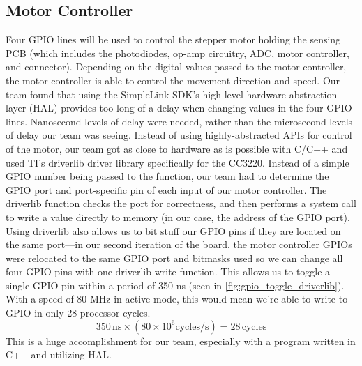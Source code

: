 \documentclass[journal]{IEEEtran}
\begin{document}
\subsection{Motor Controller}
Four GPIO lines will be used to control the stepper motor holding the sensing PCB (which includes the photodiodes, op-amp circuitry, ADC, motor controller, and connector). Depending on the digital values passed to the motor controller, the motor controller is able to control the movement direction and speed. Our team found that using the SimpleLink SDK's high-level hardware abstraction layer (HAL) provides too long of a delay when changing values in the four GPIO lines. Nanosecond-levels of delay were needed, rather than the microsecond levels of delay our team was seeing. Instead of using highly-abstracted APIs for control of the motor, our team got as close to hardware as is possible with C/C++ and used TI's driverlib driver library specifically for the CC3220. Instead of a simple GPIO number being passed to the function, our team had to determine the GPIO port and port-specific pin of each input of our motor controller. The driverlib function checks the port for correctness, and then performs a system call to write a value directly to memory (in our case, the address of the GPIO port). Using driverlib also allows us to bit stuff our GPIO pins if they are located on the same port---in our second iteration of the board, the motor controller GPIOs were relocated to the same GPIO port and bitmasks used so we can change all four GPIO pins with one driverlib write function. This allows us to toggle a single GPIO pin within a period of 350 ns (seen in \ref{fig:gpio_toggle_driverlib}). With a speed of 80 MHz in active mode, this would mean we're able to write to GPIO in only 28 processor cycles.
\begin{equation}
    350\,\mathrm{ns} \times (80\times10^6\mathrm{cycles/s}) = 28\,\mathrm{cycles}
\end{equation}
This is a huge accomplishment for our team, especially with a program written in C++ and utilizing HAL.
\end{document}
